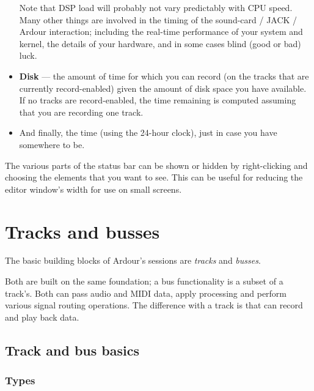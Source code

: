 \documentclass[10pt,a4paper]{book}
\begin{document}
\begin{itemize}
\begin{ddanger}
Note that DSP load will probably not vary predictably with CPU speed.
Many other things are involved in the timing of the sound-card / JACK
/ Ardour interaction; including the real-time performance of your
system and kernel, the details of your hardware, and in some cases
blind (good or bad) luck.
\end{ddanger}

\item \textbf{Disk} --- the amount of time for which you can record (on the
  tracks that are currently record-enabled) given the amount of disk
  space you have available.  If no tracks are record-enabled, the time
  remaining is computed assuming that you are recording one track.
\item And finally, the time (using the 24-hour clock), just in case
  you have somewhere to be.
\end{itemize}

The various parts of the status bar can be shown or hidden by
right-clicking and choosing the elements that you want to see.  This
can be useful for reducing the editor window's width for use on small
screens.







\chapter{Tracks and busses}
\label{ch:tracks-and-busses}

The basic building blocks of Ardour's sessions are \emph{tracks}
and \emph{busses}.

Both are built on the same foundation; a bus functionality is a
subset of a track's.  Both can pass audio and MIDI data, apply
processing and perform various signal routing operations.  The
difference with a track is that can record and play back data.

\section{Track and bus basics}

\subsection{Types}
\end{document}
